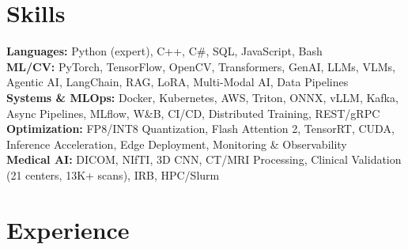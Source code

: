 \documentclass[10pt,letterpaper]{article}
\begin{document}
\section*{Skills}
\vspace{0.5pt}
{\small
\textbf{\textcolor{accent}{Languages:}} Python (expert), C++, C\#, SQL, JavaScript, Bash\\
\textbf{\textcolor{accent}{ML/CV:}} PyTorch, TensorFlow, OpenCV, Transformers, GenAI, LLMs, VLMs, Agentic AI, LangChain, RAG, LoRA, Multi-Modal AI, Data Pipelines\\
\textbf{\textcolor{accent}{Systems \& MLOps:}} Docker, Kubernetes, AWS, Triton, ONNX, vLLM, Kafka, Async Pipelines, MLflow, W\&B, CI/CD, Distributed Training, REST/gRPC\\
\textbf{\textcolor{accent}{Optimization:}} FP8/INT8 Quantization, Flash Attention 2, TensorRT, CUDA, Inference Acceleration, Edge Deployment, Monitoring \& Observability\\
\textbf{\textcolor{accent}{Medical AI:}} DICOM, NIfTI, 3D CNN, CT/MRI Processing, Clinical Validation (21 centers, 13K+ scans), IRB, HPC/Slurm
}

\vspace{0.5pt}
\section*{Experience}
\vspace{0.5pt}
\end{document}
